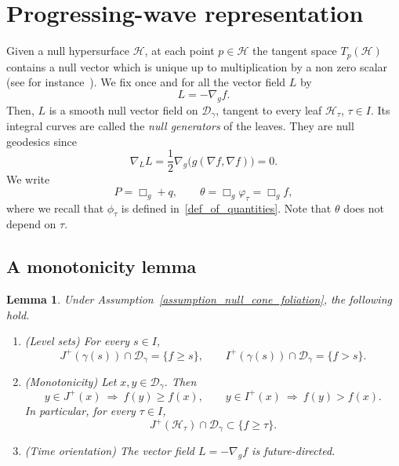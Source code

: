 \documentclass[12pt,reqno]{amsart}
\numberwithin{equation}{section}
\newcommand{\bg}{\Box_{g}}
\theoremstyle{definition}
\theoremstyle{plain}
\newtheorem{lemma}[theorem]{Lemma}
\theoremstyle{definition}
\theoremstyle{definition}
\newcommand{\n}{\mathcal{H}}
\newcommand{\D}{\mathcal{D}}
\newcommand{\Ht}{\mathcal{H}_{\tau}}
\newcommand{\dg}{\D_\gamma}
\begin{document}
\section{Progressing-wave representation}
\label{sec_progressive_wave}

Given a null hypersurface $\n$, at each point $p \in \n $ the tangent space $T_p(\n)$ contains a null vector which is unique up to multiplication by a non zero scalar (see for instance~\cite[Lemma 28]{oneill1983}). We fix once and for all the vector field $L$ by
\begin{equation}
    \label{def_of_null_vector_L}
    L=-\nabla_g f.
\end{equation}
Then, $L$ is a smooth null vector field on $\dg$, tangent to every leaf $\mathcal H_\tau$, $\tau\in I$. Its integral curves are called the \textit{null generators} of the leaves. They are null geodesics since
$$
\nabla_LL=\frac12\nabla_g\bigl(g(\nabla f,\nabla f)\bigr)=0.
$$
We write
\begin{equation}
    P=\bg+q,
  \qquad
  \theta=\Box_g\varphi_\tau=\Box_gf,
  \label{eq:phi}
\end{equation}
where we recall that $\phi_\tau$ is defined in~\eqref{def_of_quantities}. Note that $\theta$ does not depend on $\tau$.






\subsection{A monotonicity lemma}




\begin{lemma}\label{lem_monotone}
Under Assumption~\ref{assumption_null_cone_foliation}, the following hold.
\begin{enumerate}[label=(\alph*),leftmargin=*]
\item (Level sets) For every $s\in I$,
\begin{equation}\label{eq:levelsets}
J^+(\gamma(s))\cap\dg=\{f\ge s\},
\qquad
I^+(\gamma(s))\cap\dg=\{f>s\}.
\end{equation}

\item (Monotonicity) Let $x,y\in\dg$. Then
\begin{equation}\label{eq:mono}
y\in J^+(x)\ \Longrightarrow\ f(y)\ge f(x),
\qquad
y\in I^+(x)\ \Longrightarrow\ f(y)>f(x).
\end{equation}
In particular, for every $\tau\in I$,
\begin{equation*}
J^+(\Ht)\cap\dg\subset\{f\ge\tau\}.
\end{equation*}
\item (Time orientation) The vector field $L=-\nabla_gf$ is future-directed.
\end{enumerate}
\end{lemma}
\end{document}
